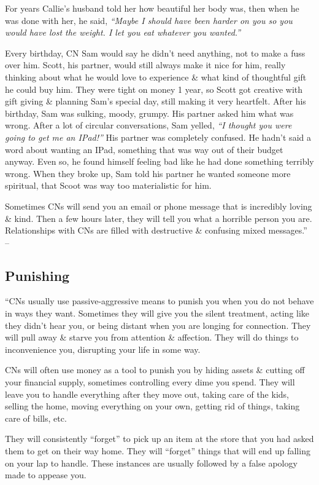 \documentclass{article}
\numberwithin{equation}{section}
\begin{document}
For years Callie's husband told her how beautiful her body was, then when he was done with her, he said, \textit{``Maybe I should have been harder on you so you would have lost the weight. I let you eat whatever you wanted.''}

Every birthday, CN Sam would say he didn't need anything, not to make a fuss over him. Scott, his partner, would still always make it nice for him, really thinking about what he would love to experience \& what kind of thoughtful gift he could buy him. They were tight on money 1 year, so Scott got creative with gift giving \& planning Sam's special day, still making it very heartfelt. After his birthday, Sam was sulking, moody, grumpy. His partner asked him what was wrong. After a lot of circular conversations, Sam yelled, \textit{``I thought you were going to get me an IPad!''} His partner was completely confused. He hadn't said a word about wanting an IPad, something that was way out of their budget anyway. Even so, he found himself feeling bad like he had done something terribly wrong. When they broke up, Sam told his partner he wanted someone more spiritual, that Scoot was way too materialistic for him.

Sometimes CNs will send you an email or phone message that is incredibly loving \& kind. Then a few hours later, they will tell you what a horrible person you are. Relationships with CNs are filled with destructive \& confusing mixed messages.'' -- \cite[pp. 86--87]{Mirza2017}

\subsection{Punishing}
``CNs usually use passive-aggressive means to punish you when you do not behave in ways they want. Sometimes they will give you the silent treatment, acting like they didn't hear you, or being distant when you are longing for connection. They will pull away \& starve you from attention \& affection. They will do things to inconvenience you, disrupting your life in some way.

CNs will often use money as a tool to punish you by hiding assets \& cutting off your financial supply, sometimes controlling every dime you spend. They will leave you to handle everything after they move out, taking care of the kids, selling the home, moving everything on your own, getting rid of things, taking care of bills, etc.

They will consistently ``forget'' to pick up an item at the store that you had asked them to get on their way home. They will ``forget'' things that will end up falling on your lap to handle. These instances are usually followed by a false apology made to appease you.
\end{document}
